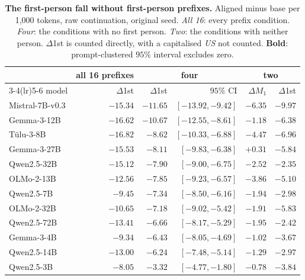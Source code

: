 \begin{table}[tb]\centering\scriptsize\setlength{\tabcolsep}{4pt}
\caption{\textbf{The first-person fall without first-person prefixes.} Aligned minus base per 1,000 tokens, raw continuation, original seed. \emph{All 16}: every prefix condition. \emph{Four}: the conditions with no first person. \emph{Two}: the conditions with neither person. $\Delta$1st is counted directly, with a capitalised \emph{US} not counted. \textbf{Bold}: prompt-clustered $95\%$ interval excludes zero.}\label{tab:birincisiz}
\begin{tabular}{lrrrrr}\toprule
 & all 16 prefixes & \multicolumn{2}{c}{four} & \multicolumn{2}{c}{two} \\ \cmidrule(lr){3-4}\cmidrule(lr){5-6}
model & $\Delta$1st & $\Delta$1st & $95\%$ CI & $\Delta M_1$ & $\Delta$1st \\ \midrule
Mistral-7B-v0.3 & $\mathbf{-15.34}$ & $\mathbf{-11.65}$ & $[-13.92,-9.42]$ & $\mathbf{-6.35}$ & $\mathbf{-9.97}$ \\
Gemma-3-12B & $\mathbf{-16.62}$ & $\mathbf{-10.67}$ & $[-12.55,-8.61]$ & $-1.18$ & $\mathbf{-6.38}$ \\
T\"ulu-3-8B & $\mathbf{-16.82}$ & $\mathbf{-8.62}$ & $[-10.33,-6.88]$ & $\mathbf{-4.47}$ & $\mathbf{-6.96}$ \\
Gemma-3-27B & $\mathbf{-15.53}$ & $\mathbf{-8.11}$ & $[-9.83,-6.38]$ & $+0.31$ & $\mathbf{-5.84}$ \\
Qwen2.5-32B & $\mathbf{-15.12}$ & $\mathbf{-7.90}$ & $[-9.00,-6.75]$ & $\mathbf{-2.52}$ & $\mathbf{-2.35}$ \\
OLMo-2-13B & $\mathbf{-12.56}$ & $\mathbf{-7.85}$ & $[-9.23,-6.57]$ & $\mathbf{-3.86}$ & $\mathbf{-5.10}$ \\
Qwen2.5-7B & $\mathbf{-9.45}$ & $\mathbf{-7.34}$ & $[-8.50,-6.16]$ & $\mathbf{-1.94}$ & $\mathbf{-2.98}$ \\
OLMo-2-32B & $\mathbf{-10.65}$ & $\mathbf{-7.18}$ & $[-9.02,-5.42]$ & $\mathbf{-1.91}$ & $\mathbf{-5.83}$ \\
Qwen2.5-72B & $\mathbf{-13.41}$ & $\mathbf{-6.66}$ & $[-8.17,-5.29]$ & $\mathbf{-1.95}$ & $\mathbf{-2.42}$ \\
Gemma-3-4B & $\mathbf{-9.34}$ & $\mathbf{-6.43}$ & $[-8.05,-4.69]$ & $-1.02$ & $\mathbf{-3.67}$ \\
Qwen2.5-14B & $\mathbf{-13.00}$ & $\mathbf{-6.24}$ & $[-7.48,-5.14]$ & $-1.29$ & $\mathbf{-2.97}$ \\
Qwen2.5-3B & $\mathbf{-8.05}$ & $\mathbf{-3.32}$ & $[-4.77,-1.80]$ & $-0.78$ & $\mathbf{-3.84}$ \\

\end{tabular}
\end{table}

